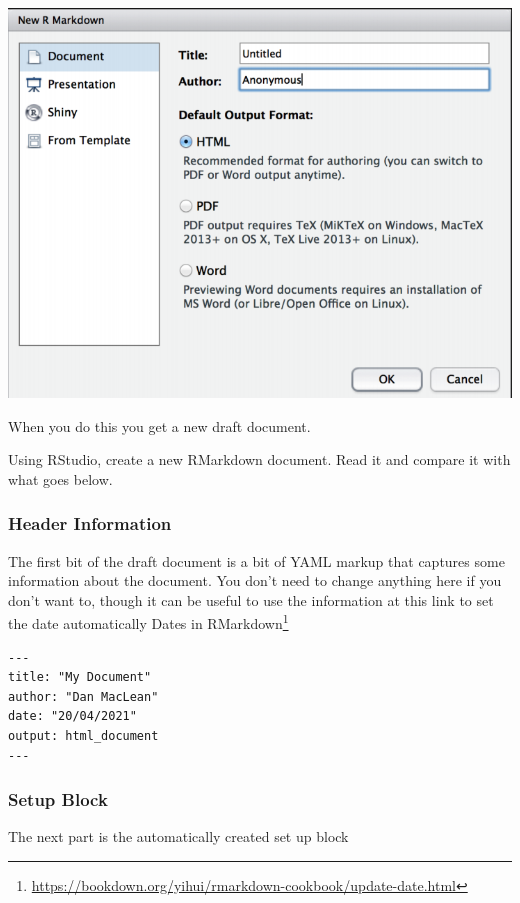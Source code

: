 \documentclass[
]{book}
\renewcommand{\href}[2]{#2\footnote{\url{#1}}}
\newenvironment{task}
{ \begin{tcolorbox}[title=For you to do,title filled] }
{  \end{tcolorbox} }
\begin{document}
\includegraphics{fig/rmd_dialogue.png}

When you do this you get a new draft document.

\begin{task}
Using RStudio, create a new RMarkdown document. Read it and compare it with what goes below.
\end{task}

\hypertarget{header-information}{%
\subsubsection{Header Information}\label{header-information}}

The first bit of the draft document is a bit of YAML markup that captures some information about the document. You don't need to change anything here if you don't want to, though it can be useful to use the information at this link to set the date automatically \href{https://bookdown.org/yihui/rmarkdown-cookbook/update-date.html}{Dates in RMarkdown}

\begin{verbatim}
---
title: "My Document"
author: "Dan MacLean"
date: "20/04/2021"
output: html_document
---
\end{verbatim}

\hypertarget{setup-block}{%
\subsubsection{Setup Block}\label{setup-block}}

The next part is the automatically created set up block
\end{document}

